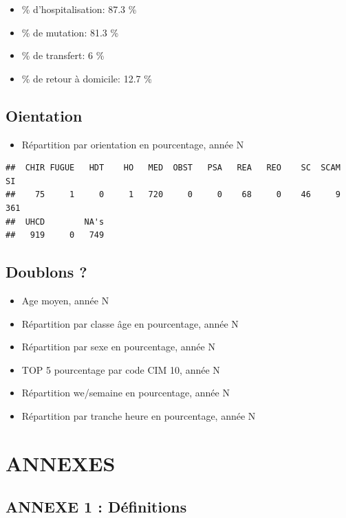 \documentclass[]{article}
\begin{document}
\begin{itemize}
\itemsep1pt\parskip0pt
\item
  \% d'hospitalisation: 87.3 \%
\item
  \% de mutation: 81.3 \%
\item
  \% de transfert: 6 \%
\item
  \% de retour à domicile: 12.7 \%
\end{itemize}

\subsection{Oientation}\label{oientation}

\begin{itemize}
\itemsep1pt\parskip0pt
\item
  Répartition par orientation en pourcentage, année N
\end{itemize}

\begin{verbatim}
##  CHIR FUGUE   HDT    HO   MED  OBST   PSA   REA   REO    SC  SCAM    SI 
##    75     1     0     1   720     0     0    68     0    46     9   361 
##  UHCD        NA's 
##   919     0   749
\end{verbatim}

\subsection{Doublons ?}\label{doublons}

\begin{itemize}
\itemsep1pt\parskip0pt
\item
  Age moyen, année N
\item
  Répartition par classe âge en pourcentage, année N
\item
  Répartition par sexe en pourcentage, année N
\item
  TOP 5 pourcentage par code CIM 10, année N
\item
  Répartition we/semaine en pourcentage, année N
\item
  Répartition par tranche heure en pourcentage, année N
\end{itemize}

\section{ANNEXES}\label{annexes}

\subsection{ANNEXE 1 : Définitions}\label{annexe-1-definitions}
\end{document}
